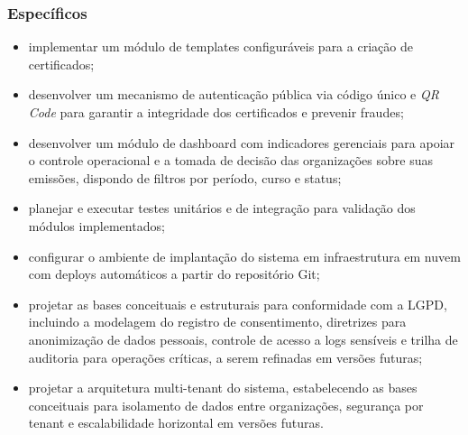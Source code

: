 \subsubsection{Específicos}\label{sec:objetivos-especificos}

\begin{itemize}
    \item implementar um módulo de templates configuráveis para a criação de certificados;
    \item desenvolver um mecanismo de autenticação pública via código único e \textit{QR Code} para garantir a integridade dos certificados e prevenir fraudes;
    \item desenvolver um módulo de dashboard com indicadores gerenciais para apoiar o controle operacional e a tomada de decisão das organizações sobre suas emissões, dispondo de filtros por período, curso e status;
    \item planejar e executar testes unitários e de integração para validação dos módulos implementados;
    \item configurar o ambiente de implantação do sistema em infraestrutura em nuvem com deploys automáticos a partir do repositório Git;
    \item projetar as bases conceituais e estruturais para conformidade com a LGPD, incluindo a modelagem do registro de consentimento, diretrizes para anonimização de dados pessoais, controle de acesso a logs sensíveis e trilha de auditoria para operações críticas, a serem refinadas em versões futuras;
    \item projetar a arquitetura multi-tenant do sistema, estabelecendo as bases conceituais para isolamento de dados entre organizações, segurança por tenant e escalabilidade horizontal em versões futuras.
\end{itemize}
